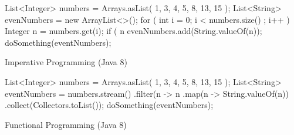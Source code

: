 \begin{center}
\begin{minipage}{0.47\textwidth}
\begin{sourcecode}
\begin{javacode}{}
List<Integer> numbers = 
	Arrays.asList( 1, 3, 4, 5, 8, 13, 15 );
List<String> evenNumbers = new ArrayList<>();
for ( int i = 0; i < numbers.size() ; i++ ) {
    Integer n = numbers.get(i);
    if ( n %
        evenNumbers.add(String.valueOf(n));
}
doSomething(eventNumbers);
\end{javacode}
\caption{Imperative Programming (Java 8)}
\label{code:imperative-pro}
\end{sourcecode}
\end{minipage}\hspace{0.6cm}
\begin{minipage}{0.47\textwidth}
\begin{sourcecode}
\begin{javacode}{}
List<Integer> numbers = 
	Arrays.asList( 1, 3, 4, 5, 8, 13, 15 );
List<String> eventNumbers = numbers.stream()
        .filter(n -> n %
        .map(n -> String.valueOf(n))
        .collect(Collectors.toList());
doSomething(eventNumbers);
\end{javacode}
\caption{Functional Programming (Java 8)}
\label{code:functional-pro}
\end{sourcecode}
\end{minipage}
\end{center}